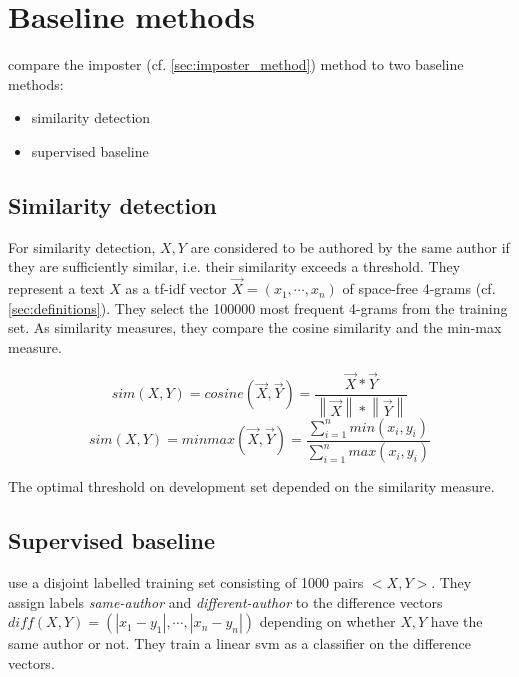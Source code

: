 \section{Baseline methods}
\label{sec:imposter_baseline_methods}

\citet{koppel_determining_2014} compare the imposter (cf. \autoref{sec:imposter_method}) method to two baseline methods:
\begin{itemize}
    \item similarity detection
    \item supervised baseline
\end{itemize}


\subsection{Similarity detection}
\label{sec:imp_similarity_detection}

For similarity detection, $X,Y$ are considered to be authored by the same author if they are sufficiently similar, 
i.e. their similarity exceeds a threshold.
They represent a text $X$ as a tf-idf vector $\overrightarrow{X}= (x_1, \cdots , x_n)$ 
of space-free 4-grams (cf. \autoref{sec:definitions}).
They select the 100000 most frequent 4-grams from the training set.
As similarity measures, they compare the cosine similarity and the min-max measure.

$$sim(X,Y)=cosine(\overrightarrow{X},\overrightarrow{Y})=\frac{\overrightarrow{X}*\overrightarrow{Y}}{\left\| \overrightarrow{X} \right\|*\left\| \overrightarrow{Y} \right\|}$$
$$sim(X,Y)=minmax(\overrightarrow{X},\overrightarrow{Y})=\frac{\sum_{i=1}^{n}min(x_i,y_i)}{\sum_{i=1}^{n}max(x_i,y_i)}$$

The optimal threshold on \citet{koppel_determining_2014} development set depended on the similarity measure.


\subsection{Supervised baseline}
\label{sec:imp_supervised_baseline}

\citet{koppel_determining_2014} use a disjoint labelled training set consisting of 1000 pairs $<X,Y>$.
They assign labels \textit{same-author} and \textit{different-author} 
to the difference vectors $diff(X,Y)= (\left| x_1-y_1 \right|, \cdots , \left| x_n-y_n \right|)$ 
depending on whether $X,Y$ have the same author or not.
They train a linear \ac{svm} as a classifier on the difference vectors.
